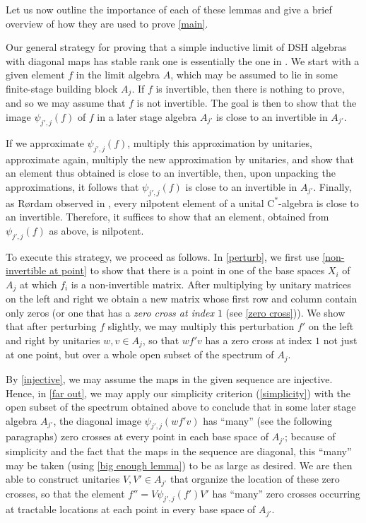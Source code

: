 \documentclass[12pt]{amsart}
\numberwithin{equation}{section}
\theoremstyle{definition}
\theoremstyle{remark}
\begin{document}
\noindent
Let us now outline the importance of each of these lemmas and give a brief overview of how they are used to prove \autoref{main}.

Our general strategy for proving that a simple inductive limit of DSH algebras with diagonal maps has stable rank one is essentially the one in \cite{EHT}. We start with a given element $f$ in the limit algebra $A$, which may be assumed to lie in some finite-stage building block $A_{j}$. If $f$ is invertible, then there is nothing to prove, and so we may assume that $f$ is not invertible. The goal is then to show that the image $\psi_{j',j}(f)$ of $f$ in a later stage algebra $A_{j'}$ is close to an invertible in $A_{j'}$. 

If we approximate $\psi_{j',j}(f)$, multiply this approximation by unitaries, approximate again, multiply the new approximation by unitaries, and show that an element thus obtained is close to an invertible, then, upon unpacking the approximations, it follows that $\psi_{j',j}(f)$ is close to an invertible in $A_{j'}$. Finally, as R\o rdam observed in \cite{Ror}, every nilpotent element of a unital $\mathrm{C}^*$-algebra is close to an invertible. Therefore, it suffices to show that an element, obtained from $\psi_{j',j}(f)$ as above, is nilpotent. 

To execute this strategy, we proceed as follows. In \autoref{perturb}, we first use \autoref{non-invertible at point} to show that there is a point in one of the base spaces $X_{i}$ of $A_{j}$ at which $f_{i}$ is a non-invertible matrix. After multiplying by unitary matrices on the left and right we obtain a new matrix whose first row and column contain only zeros (or one that has a \textit{zero cross at index $1$} (see \autoref{zero cross})). We show that after perturbing $f$ slightly, we may multiply this perturbation $f'$ on the left and right by unitaries $w,v\in A_{j}$, so that $wf'v$ has a zero cross at index $1$ not just at one point, but over a whole open subset of the spectrum of $A_{j}$.

By \autoref{injective}, we may assume the maps in the given sequence are injective. Hence, in \autoref{far out}, we may apply our simplicity criterion (\autoref{simplicity}) with the open subset of the spectrum obtained above to conclude that in some later stage algebra $A_{j'}$, the diagonal image $\psi_{j',j}(wf'v)$ has ``many'' (see the following paragraphs) zero crosses at every point in each base space of $A_{j'}$; because of simplicity and the fact that the maps in the sequence are diagonal, this ``many'' may be taken (using \autoref{big enough lemma}) to be as large as desired. We are then able to construct unitaries $V,V'\in A_{j'}$ that organize the location of these zero crosses, so that the element $f''=V\psi_{j',j}(f')V'$ has ``many'' zero crosses occurring at tractable locations at each point in every base space of $A_{j'}$. 
\end{document}
